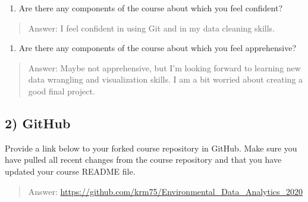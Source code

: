 \documentclass[
]{article}
\providecommand{\tightlist}{%
  \setlength{\itemsep}{0pt}\setlength{\parskip}{0pt}}
\begin{document}
\begin{enumerate}
\def\labelenumi{\arabic{enumi}.}
\setcounter{enumi}{1}
\tightlist
\item
  Are there any components of the course about which you feel confident?
\end{enumerate}

\begin{quote}
Answer: I feel confident in using Git and in my data cleaning skills.
\end{quote}

\begin{enumerate}
\def\labelenumi{\arabic{enumi}.}
\setcounter{enumi}{2}
\tightlist
\item
  Are there any components of the course about which you feel
  apprehensive?
\end{enumerate}

\begin{quote}
Answer: Maybe not apprehensive, but I'm looking forward to learning new
data wrangling and visualization skills. I am a bit worried about
creating a good final project.
\end{quote}

\hypertarget{github}{%
\subsection{2) GitHub}\label{github}}

Provide a link below to your forked course repository in GitHub. Make
sure you have pulled all recent changes from the course repository and
that you have updated your course README file.

\begin{quote}
Answer: \url{https://github.com/krm75/Environmental_Data_Analytics_2020}
\end{quote}
\end{document}
